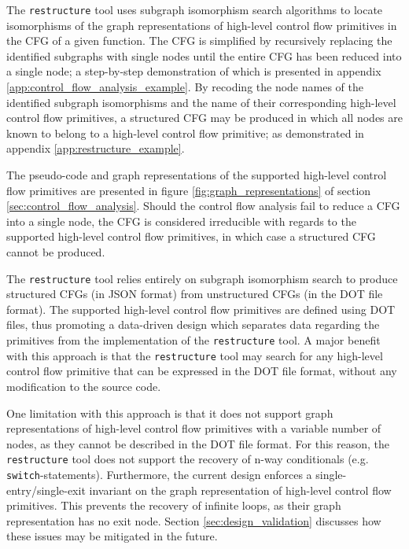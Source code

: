 The \texttt{restructure} tool uses subgraph isomorphism search algorithms to locate isomorphisms of the graph representations of high-level control flow primitives in the CFG of a given function. The CFG is simplified by recursively replacing the identified subgraphs with single nodes until the entire CFG has been reduced into a single node; a step-by-step demonstration of which is presented in appendix \ref{app:control_flow_analysis_example}. By recoding the node names of the identified subgraph isomorphisms and the name of their corresponding high-level control flow primitives, a structured CFG may be produced in which all nodes are known to belong to a high-level control flow primitive; as demonstrated in appendix \ref{app:restructure_example}.

The pseudo-code and graph representations of the supported high-level control flow primitives are presented in figure \ref{fig:graph_representations} of section \ref{sec:control_flow_analysis}. Should the control flow analysis fail to reduce a CFG into a single node, the CFG is considered irreducible with regards to the supported high-level control flow primitives, in which case a structured CFG cannot be produced.

The \texttt{restructure} tool relies entirely on subgraph isomorphism search to produce structured CFGs (in JSON format) from unstructured CFGs (in the DOT file format). The supported high-level control flow primitives are defined using DOT files, thus promoting a data-driven design which separates data regarding the primitives from the implementation of the \texttt{restructure} tool. A major benefit with this approach is that the \texttt{restructure} tool may search for any high-level control flow primitive that can be expressed in the DOT file format, without any modification to the source code.

One limitation with this approach is that it does not support graph representations of high-level control flow primitives with a variable number of nodes, as they cannot be described in the DOT file format. For this reason, the \texttt{restructure} tool does not support the recovery of n-way conditionals (e.g. \texttt{switch}-statements). Furthermore, the current design enforces a single-entry/single-exit invariant on the graph representation of high-level control flow primitives. This prevents the recovery of infinite loops, as their graph representation has no exit node. Section \ref{sec:design_validation} discusses how these issues may be mitigated in the future.
